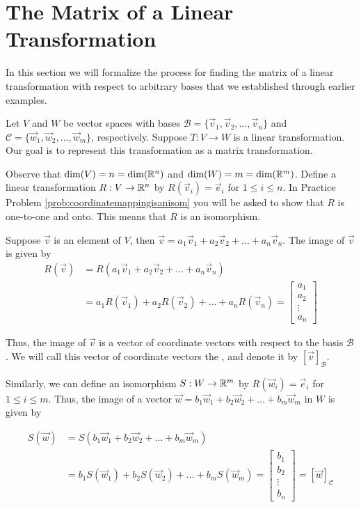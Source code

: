 \documentclass{ximera}
\begin{document}
\section{The Matrix of a Linear Transformation}
In this section we will formalize the process for finding the matrix of a linear transformation with respect to arbitrary bases that we established through earlier examples.

Let $V$ and $W$ be vector spaces with bases $\mathcal{B}=\{\vec{v}_1, \vec{v}_2,\ldots ,\vec{v}_n\}$ and $\mathcal{C}=\{\vec{w}_1, \vec{w}_2,\ldots ,\vec{w}_m\}$, respectively.   Suppose $T:V\rightarrow W$ is a linear transformation.  Our goal is to represent this transformation as a matrix transformation.

Observe that $\text{dim}(V)=n=\text{dim}(\mathbb{R}^n)$ and $\text{dim}(W)=m=\text{dim}(\mathbb{R}^m)$. Define a linear transformation $R:V\rightarrow \mathbb{R}^n$ by $R(\vec{v}_i)=\vec{e}_i$ for $1\leq i\leq n$.  In Practice Problem \ref{prob:coordinatemappingisanisom} you will be asked to show that $R$ is one-to-one and onto.  This means that $R$ is an isomorphism.  

Suppose $\vec{v}$ is an element of $V$, then $\vec{v}=a_1\vec{v}_1+a_2\vec{v}_2+\ldots +a_n\vec{v}_n$.  The image of $\vec{v}$ is given by
\begin{align*}
R(\vec{v})&=R(a_1\vec{v}_1+a_2\vec{v}_2+\ldots +a_n\vec{v}_n)\\&=a_1R(\vec{v}_1)+a_2R(\vec{v}_2)+\ldots +a_nR(\vec{v}_n)=\begin{bmatrix}a_1\\a_2\\\vdots\\a_n\end{bmatrix}
\end{align*}

Thus, the image of $\vec{v}$ is a vector of coordinate vectors with respect to the basis $\mathcal{B}$.  We will call this vector of coordinate vectors the , and denote it by $[\vec{v}]_{\mathcal{B}}$.

Similarly, we can define an isomorphism $S:W\rightarrow \mathbb{R}^m$ by $R(\vec{w}_i)=\vec{e}_i$ for $1\leq i\leq m$. Thus, the image of a vector $\vec{w}=b_1\vec{w}_1+b_2\vec{w}_2+\ldots +b_m\vec{w}_m$ in $W$ is given by

\begin{align*}
S(\vec{w})&=S(b_1\vec{w}_1+b_2\vec{w}_2+\ldots +b_m\vec{w}_m)\\&=b_1S(\vec{w}_1)+b_2S(\vec{w}_2)+\ldots +b_mS(\vec{w}_m)=\begin{bmatrix}b_1\\b_2\\\vdots\\b_n\end{bmatrix}=[\vec{w}]_{\mathcal{C}}
\end{align*}
\end{document}
